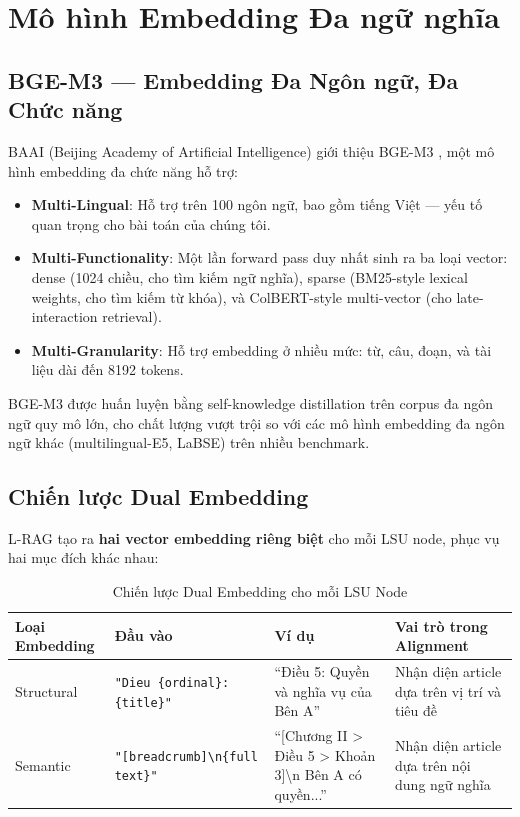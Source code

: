 \section{Mô hình Embedding Đa ngữ nghĩa}

\subsection{BGE-M3 — Embedding Đa Ngôn ngữ, Đa Chức năng}

BAAI (Beijing Academy of Artificial Intelligence) giới thiệu BGE-M3 \cite{chen2024bge}, một mô hình embedding đa chức năng hỗ trợ:

\begin{itemize}
    \item \textbf{Multi-Lingual}: Hỗ trợ trên 100 ngôn ngữ, bao gồm tiếng Việt — yếu tố quan trọng cho bài toán của chúng tôi.
    \item \textbf{Multi-Functionality}: Một lần forward pass duy nhất sinh ra ba loại vector: dense (1024 chiều, cho tìm kiếm ngữ nghĩa), sparse (BM25-style lexical weights, cho tìm kiếm từ khóa), và ColBERT-style multi-vector \cite{colbert2021} (cho late-interaction retrieval).
    \item \textbf{Multi-Granularity}: Hỗ trợ embedding ở nhiều mức: từ, câu, đoạn, và tài liệu dài đến 8192 tokens.
\end{itemize}

BGE-M3 được huấn luyện bằng self-knowledge distillation trên corpus đa ngôn ngữ quy mô lớn, cho chất lượng vượt trội so với các mô hình embedding đa ngôn ngữ khác (multilingual-E5, LaBSE) trên nhiều benchmark.

\subsection{Chiến lược Dual Embedding}

L-RAG tạo ra \textbf{hai vector embedding riêng biệt} cho mỗi LSU node, phục vụ hai mục đích khác nhau:

\begin{table}[H]
    \centering
    \caption{Chiến lược Dual Embedding cho mỗi LSU Node}
    \label{tab:dual_embedding}
    \begin{tabularx}{\textwidth}{p{2.2cm} p{4.5cm} p{5.5cm} X}
        \toprule
        \textbf{Loại Embedding} & \textbf{Đầu vào} & \textbf{Ví dụ} & \textbf{Vai trò trong Alignment}\\
        \midrule
        Structural & \texttt{"Dieu \{ordinal\}: \{title\}"} & ``Điều 5: Quyền và nghĩa vụ của Bên A'' & Nhận diện article dựa trên vị trí và tiêu đề\\
        Semantic & \texttt{"[breadcrumb]\textbackslash n\{full text\}"} & ``[Chương II > Điều 5 > Khoản 3]\textbackslash n Bên A có quyền...'' & Nhận diện article dựa trên nội dung ngữ nghĩa\\
        \bottomrule
    \end{tabularx}
\end{table}

